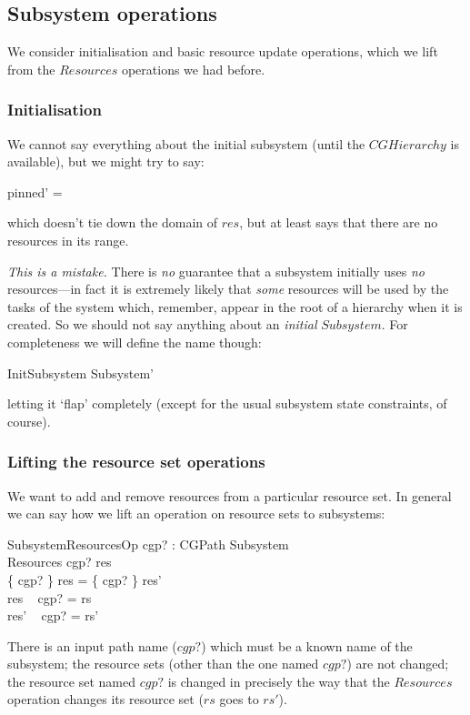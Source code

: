 \documentclass[a4paper,twoside,12pt]{article}
\begin{document}
\subsection{Subsystem operations}
We consider initialisation
and basic resource update operations, which we lift from the $Resources$ operations we had before.

\subsubsection{Initialisation}
We cannot say everything about the initial subsystem (until the $CGHierarchy$ is available), but we might try to
say:
\begin{zed}
pinned' = \emptyset
\end{zed}
which doesn't tie down the domain of $res$, but at least says that there are no resources in its range.

\emph{This is a mistake.}
There is \emph{no} guarantee that a subsystem initially uses \emph{no} resources---in fact it is
extremely likely that \emph{some} resources will be used by the tasks of the system which, remember, appear in the
root of a hierarchy when
it is created. So we should not say anything about an \emph{initial} $Subsystem$.
For completeness we will define the name though:
\begin{zed}
InitSubsystem  Subsystem'
\end{zed}
letting it `flap' completely (except for the usual subsystem state constraints, of course).

\subsubsection{Lifting the resource set operations}
We want to add and remove resources from a particular resource set. In general we can say
how we lift an operation on resource sets to subsystems:

\begin{schema}{SubsystemResourcesOp}
cgp? : CGPath
\also
\Delta Subsystem \\
\Delta Resources
\where
cgp? \in \dom res \\
\{ cgp? \} \ndres res = \{ cgp? \} \ndres res' \\
res ~ cgp? = rs \\
res' ~ cgp? = rs'
\end{schema}
There is an input path name ($cgp?$) which must be a known name of the subsystem;
the resource sets (other than the one named $cgp?$) are not changed;
the resource set named $cgp?$ is changed in precisely the way that the $Resources$ operation changes
its resource set ($rs$ goes to $rs'$).
\end{document}
